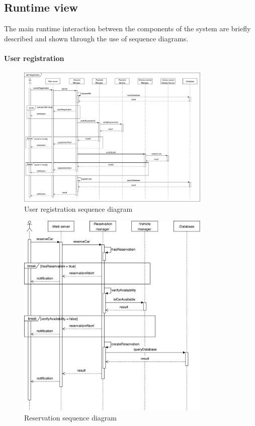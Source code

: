 \subsection{Runtime view}

The main runtime interaction between the components of the system are briefly described and shown through the use of sequence diagrams.

\paragraph{User registration}

\begin{figure}[H]
	\includegraphics[width=350px]{../Datas/diagrams/registration.pdf}
	\caption{User registration sequence diagram}
	\label{fig:user-registration-seq-dig}
\end{figure}

\begin{figure}[H]
        \includegraphics[width=350px]{../Datas/diagrams/reservation.pdf}
        \caption{Reservation sequence diagram}
        \label{fig:reservation-seq-dig}
\end{figure}

